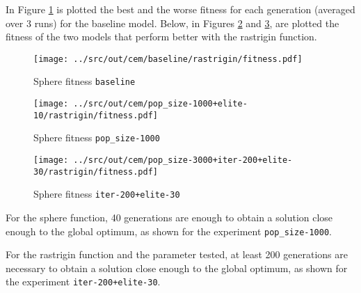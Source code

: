 In Figure \ref{fig:cem-r-fitness/baseline} is plotted the best and the worse fitness for each generation (averaged over 3 runs) for the baseline model. Below, in Figures \ref{fig:cem-r-fitness/1000} and \ref{fig:cem-r-fitness/200}, are plotted the fitness of the two models that perform better with the rastrigin function.

\begin{figure}[H]
	\centering
	\begin{minipage}[b]{.6\textwidth}
		\texttt{[image: ../src/out/cem/baseline/rastrigin/fitness.pdf]}	
	\end{minipage}
	\caption{Sphere fitness \texttt{baseline}}
	\label{fig:cem-r-fitness/baseline}
\end{figure}
\begin{figure}[htb]
	\centering
	\begin{minipage}[b]{.6\textwidth}
		\texttt{[image: ../src/out/cem/pop\_size-1000+elite-10/rastrigin/fitness.pdf]}	
	\end{minipage}
	\caption{Sphere fitness \texttt{pop\_size-1000}}
	\label{fig:cem-r-fitness/1000}
\end{figure}
\begin{figure}[htb]
	\centering	
	\begin{minipage}[b]{.6\textwidth}
		\texttt{[image: ../src/out/cem/pop\_size-3000+iter-200+elite-30/rastrigin/fitness.pdf]}	
	\end{minipage}
	\caption{Sphere fitness \texttt{iter-200+elite-30}}
	\label{fig:cem-r-fitness/200}
\end{figure}

\bigskip
For the sphere function, 40 generations are enough to obtain a solution close enough to the global optimum, as shown for the experiment \texttt{pop\_size-1000}.

For the rastrigin function and the parameter tested, at least 200 generations are necessary to obtain a solution close enough to the global optimum, as shown for the experiment \texttt{iter-200+elite-30}.